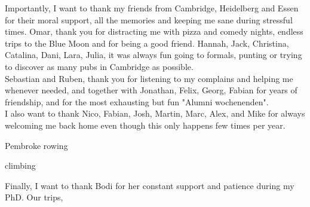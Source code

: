 \begin{acknowledgements}
\newpage
\thispagestyle{empty}
 
Importantly, I want to thank my friends from Cambridge, Heidelberg and Essen for their moral support, all the memories and keeping me sane during stressful times. Omar, thank you for distracting me with pizza and comedy nights, endless trips to the Blue Moon and for being a good friend. Hannah, Jack, Christina, Catalina, Dani, Lara, Julia, it was always fun going to formals, punting or trying to discover as many pubs in Cambridge as possible.\\

Sebastian and Ruben, thank you for listening to my complains and helping me whenever needed, and together with Jonathan, Felix, Georg, Fabian for years of friendship, and for the most exhausting but fun "Alumni wochenenden".  \\

I also want to thank Nico, Fabian, Josh, Martin, Marc, Alex, and Mike for always welcoming me back home even though this only happens few times per year.  

Pembroke rowing

climbing

Finally, I want to thank Bodi for her constant support and patience during my PhD. Our trips, 

\end{acknowledgements}
